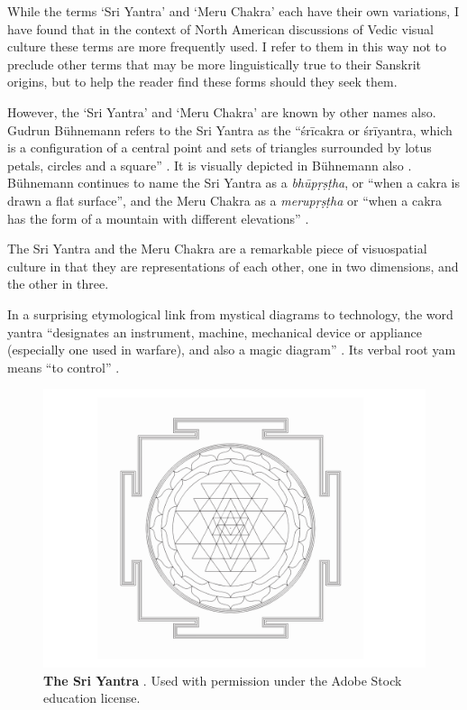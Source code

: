 While the terms ‘Sri Yantra’ and ‘Meru Chakra’ each have their own variations, I have found that in the context of North American discussions of Vedic visual culture these terms are more frequently used. I refer to them in this way not to preclude other terms that may be more linguistically true to their Sanskrit origins, but to help the reader find these forms should they seek them. 

However, the ‘Sri Yantra’ and ‘Meru Chakra’ are known by other names also. Gudrun Bühnemann refers to the Sri Yantra as the “śrīcakra or śrīyantra, which is a configuration of a central point and sets of triangles surrounded by lotus petals, circles and a square” \citep[p. 2]{buhnemann_mandalas_2003}. It is visually depicted in Bühnemann also \citep[p. 31]{buhnemann_mandalas_2003}. Bühnemann continues to name the Sri Yantra as a \textit{ bhūpṛṣṭha}, or “when a cakra is drawn a flat surface”, and the Meru Chakra as a \textit{merupṛṣṭha} or “when a cakra has the form of a mountain with different elevations” \citep[p. 31]{buhnemann_mandalas_2003}. 

The Sri Yantra and the Meru Chakra are a remarkable piece of visuospatial culture in that they are representations of each other, one in two dimensions, and the other in three.

In a surprising etymological link from mystical diagrams to technology, the word yantra “designates an instrument, machine, mechanical device or appliance (especially one used in warfare), and also a magic diagram” \citep[p. 28]{buhnemann_mandalas_2003}. Its verbal root yam means “to control” \citep[p. 28]{buhnemann_mandalas_2003}.
\begin{figure}[h]
    \centering
    \includegraphics[width=0.5\linewidth]{figures/f6.png}
    \caption[The Sri Yantra]{\textbf{The Sri Yantra} \citep{alexandradesign_yantra_nodate}. Used with permission under the Adobe Stock education license.}
    \label{f6}
\end{figure}

